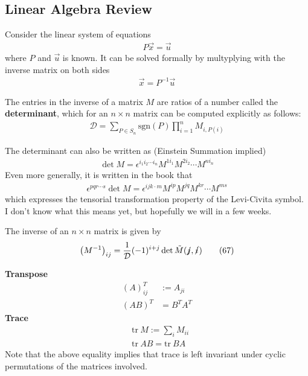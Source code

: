 \subsection{Linear Algebra Review}
Consider the linear system of equations \begin{align*}
    P \vec{x} = \vec{u}
\end{align*}
where \(P\) and \(\vec{u}\) is known. It can be solved formally by multyplying with the inverse matrix on both sides \begin{align*}
    \vec{x} = P^{-1} \vec{u}
\end{align*}

\begin{theorem}[Determinant]
    The entries in the inverse of a matrix \(M\) are ratios of a number called the \textbf{determinant}, which for an \(n\times n\) matrix can be computed explicitly as follows: \begin{align*}
        \boxed{\mathcal{D} = \sum_{P \in S_n} \mathrm{sgn}(P) \prod_{i = 1}^{n} M_{i, P(i)}} \tag{56}
    \end{align*}
\end{theorem}

\begin{remark}
    The determinant can also be written as (Einstein Summation implied) \begin{align*}
        \det M = \epsilon ^{i_1 i_2 \cdots i_n}  M^{1i_1} M^{2i_2} \cdots M^{ni_n}
    \end{align*}
    Even more generally, it is written in the book that \begin{align*}
        \epsilon ^{pqr \cdots s} \det M = \epsilon ^{i j k \cdot m} M^{ip}M^{jq} M^{kr} \cdots M^{ms} \tag{67}
    \end{align*}
    which expresses the tensorial transformation property of the Levi-Civita symbol. I don't know what this means yet, but hopefully we will in a few weeks.
\end{remark}

\begin{theorem}
    The inverse of an \(n\times n\) matrix is given by \begin{align*}
        \left( M^{-1}  \right)_{ij} = \frac{1}{\mathcal{D} } (-1)^{i + j} \det \tilde{M}(\slashed{j}, \slashed{i}) \tag{67}
    \end{align*}
\end{theorem}

\textbf{Transpose}\begin{align*}
    \left( A \right)_{ij} ^T & := A_{ji}\\  
    \left( AB \right) ^T &= B^T A^T
\end{align*} 
\textbf{Trace}
\begin{align*}
    &\mathrm{tr}\ M := \sum_i M_{ii}\\
    &\mathrm{tr}\ AB = \mathrm{tr}\ BA
\end{align*} 
Note that the above equality implies that trace is left invariant under cyclic permutations of the matrices involved.

